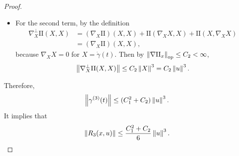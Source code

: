 \begin{proof}
\begin{itemize}
        \item For the second term, by the definition
        \begin{align*}
            \nabla_X^{\perp} \mathrm{II}(X, X)&=\left(\nabla_X \mathrm{II}\right)(X, X)+\mathrm{II}\left(\nabla_X X, X\right)+\mathrm{II}\left(X, \nabla_X X\right) \\
            &=\left(\nabla_X \mathrm{II}\right)(X, X),
        \end{align*}
        because $\nabla_XX = 0$ for $X = \dot{\gamma}(t)$. Then by $\left\lVert\nabla\mathrm{II}_x\right\lVert_{\operatorname{op}} \leq C_2 < \infty$,
        \begin{equation*}
            \left\lVert\nabla_X^{\perp} \mathrm{II}(X, X)\right\lVert \leq C_2 \left\lVert X\right\lVert^3 = C_2 \left\lVert u\right\lVert^3.
        \end{equation*}
    \end{itemize}
    Therefore,
    \begin{equation*}
        \left\lVert\gamma^{(3)}(t)\right\lVert \leq (C_1^2 + C_2)\left\lVert u\right\lVert^3.
    \end{equation*}
    It implies that
    \begin{equation*}
        \left\lVert R_3(x,u)\right\lVert \leq \frac{C_1^2 + C_2}{6}\left\lVert u\right\lVert^3. \qedhere
    \end{equation*}
\end{proof}


